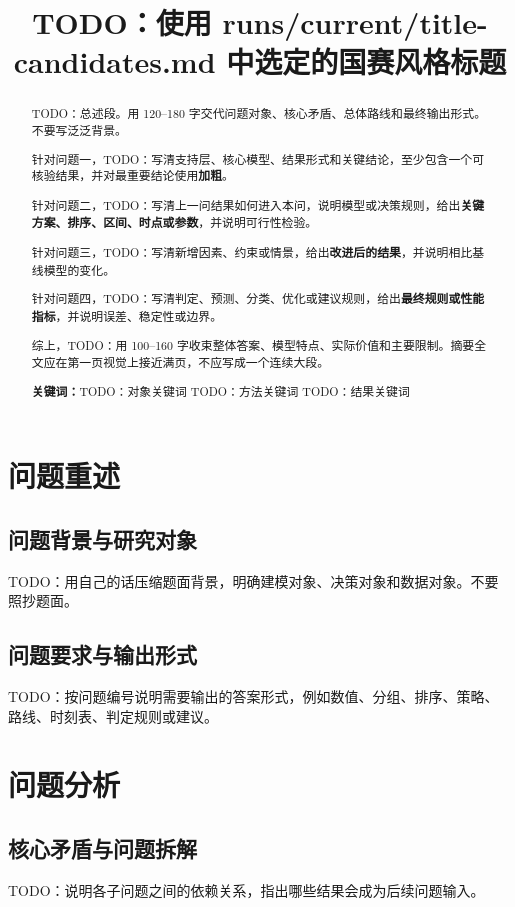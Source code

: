 \documentclass{ctexart}
\title{TODO：使用 runs/current/title-candidates.md 中选定的国赛风格标题}
\author{}
\date{}
\newcommand{\keywords}[1]{\par\noindent\textbf{关键词：}#1}
\begin{document}
\maketitle

\begin{abstract}
TODO：总述段。用 120--180 字交代问题对象、核心矛盾、总体路线和最终输出形式。不要写泛泛背景。

针对问题一，TODO：写清支持层、核心模型、结果形式和关键结论，至少包含一个可核验结果，并对最重要结论使用\textbf{加粗}。

针对问题二，TODO：写清上一问结果如何进入本问，说明模型或决策规则，给出\textbf{关键方案、排序、区间、时点或参数}，并说明可行性检验。

针对问题三，TODO：写清新增因素、约束或情景，给出\textbf{改进后的结果}，并说明相比基线模型的变化。

针对问题四，TODO：写清判定、预测、分类、优化或建议规则，给出\textbf{最终规则或性能指标}，并说明误差、稳定性或边界。

综上，TODO：用 100--160 字收束整体答案、模型特点、实际价值和主要限制。摘要全文应在第一页视觉上接近满页，不应写成一个连续大段。

\keywords{TODO：对象关键词 \quad TODO：方法关键词 \quad TODO：结果关键词}
\end{abstract}

\section{问题重述}

\subsection{问题背景与研究对象}
TODO：用自己的话压缩题面背景，明确建模对象、决策对象和数据对象。不要照抄题面。

\subsection{问题要求与输出形式}
TODO：按问题编号说明需要输出的答案形式，例如数值、分组、排序、策略、路线、时刻表、判定规则或建议。

\section{问题分析}

\subsection{核心矛盾与问题拆解}
TODO：说明各子问题之间的依赖关系，指出哪些结果会成为后续问题输入。
\end{document}

